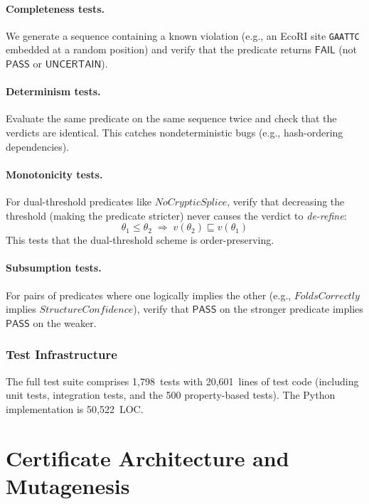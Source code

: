 \documentclass[acmsmall,review,anonymous]{acmart}
\newcommand{\PASS}{\ensuremath{\mathsf{PASS}}\xspace}
\newcommand{\FAIL}{\ensuremath{\mathsf{FAIL}}\xspace}
\newcommand{\UNCERTAIN}{\ensuremath{\mathsf{UNCERTAIN}}\xspace}
\newcommand{\verdict}{v}
\begin{document}
\paragraph{Completeness tests.}
We generate a sequence containing a known violation (e.g., an EcoRI
site \texttt{GAATTC} embedded at a random position) and verify that
the predicate returns \FAIL{} (not \PASS{} or \UNCERTAIN{}).

\paragraph{Determinism tests.}
Evaluate the same predicate on the same sequence twice and check that
the verdicts are identical.
This catches nondeterministic bugs (e.g., hash-ordering dependencies).

\paragraph{Monotonicity tests.}
For dual-threshold predicates like $\mathit{NoCrypticSplice}$, verify
that decreasing the threshold (making the predicate stricter) never
causes the verdict to \emph{de-refine}:
\[
  \theta_1 \le \theta_2 \;\Longrightarrow\;
  \verdict(\theta_2) \sqsubseteq \verdict(\theta_1)
\]
This tests that the dual-threshold scheme is order-preserving.

\paragraph{Subsumption tests.}
For pairs of predicates where one logically implies the other
(e.g., $\mathit{FoldsCorrectly}$ implies
$\mathit{StructureConfidence}$), verify that \PASS{} on the stronger
predicate implies \PASS{} on the weaker.

\subsubsection{Test Infrastructure}

The full test suite comprises 1{,}798~tests with 20{,}601~lines of
test code (including unit tests, integration tests, and the 500
property-based tests).
The Python implementation is 50{,}522~LOC.

\section{Certificate Architecture and Mutagenesis}\label{sec:cert-mut}
\end{document}
